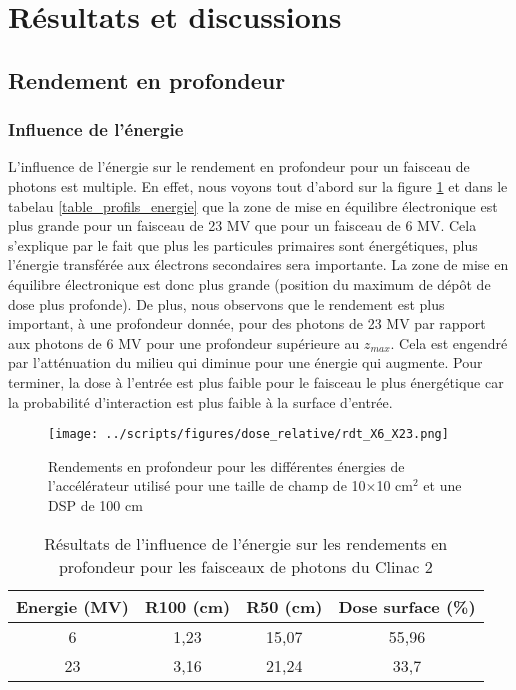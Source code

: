 \documentclass{article}
\begin{document}
\section{Résultats et discussions}
\subsection{Rendement en profondeur}
\subsubsection{Influence de l'énergie}

L'influence de l'énergie sur le rendement en profondeur pour un faisceau de photons est multiple. En effet, nous voyons tout d'abord sur la figure \ref*{fig_rdt_energie} et dans le tabelau \ref*{table_profils_energie} que la zone de mise en équilibre électronique est plus grande pour un faisceau de 23 MV que pour un faisceau de 6 MV. Cela s'explique par le fait que plus les particules primaires sont énergétiques, plus l'énergie transférée aux électrons secondaires sera importante. La zone de mise en équilibre électronique est donc plus grande (position du maximum de dépôt de dose plus profonde). De plus, nous observons que le rendement est plus important, à une profondeur donnée, pour des photons de 23 MV par rapport aux photons de 6 MV pour une profondeur supérieure au $z_{max}$. Cela est engendré par l'atténuation du milieu qui diminue pour une énergie qui augmente. Pour terminer, la dose à l'entrée est plus faible pour le faisceau le plus énergétique car la probabilité d'interaction est plus faible à la surface d'entrée.

\begin{figure}[h]
  \centering
  \texttt{[image: ../scripts/figures/dose\_relative/rdt\_X6\_X23.png]}
  \caption{Rendements en profondeur pour les différentes énergies de l'accélérateur utilisé pour une taille de champ de 10$\times$10 cm$^2$ et une DSP de 100 cm}
  \label{fig_rdt_energie}
\end{figure}

\begin{table}[h]
  \centering
  \begin{tabular}{cccc}
    \toprule
    \textbf{Energie (MV)} & \textbf{R100 (cm)} & \textbf{R50 (cm)} & \textbf{Dose surface (\%)} \\
    \toprule
    6 & 1,23 & 15,07 & 55,96 \\
    23 & 3,16 & 21,24 & 33,7 \\
    \bottomrule
  \end{tabular}
  \caption{Résultats de l'influence de l'énergie sur les rendements en profondeur pour les faisceaux de photons du Clinac 2}
  \label{table_rdt_energie}
\end{table}
\end{document}
